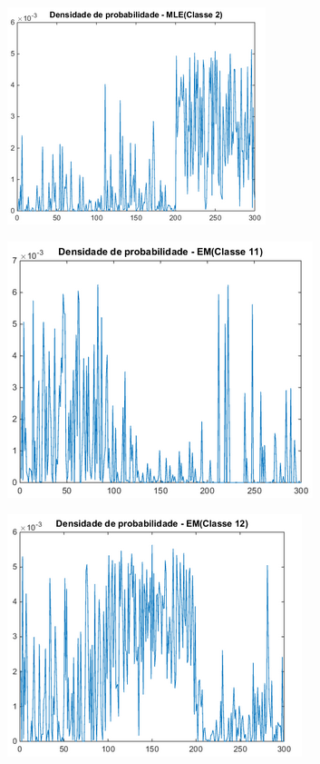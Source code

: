 \documentclass[12pt,twoside]{report}
\begin{document}
\begin{figure}[ht]
    \centering
    \includegraphics[scale=0.85]{pdf_mle_c2}
    \caption{}
    \label{fig:pdf_mle_c2}
\end{figure}

\begin{figure}[ht]
    \centering
    \includegraphics[scale=0.75]{pdf_em_c11}
    \caption{}
    \label{fig:pdf_em_c11}
\end{figure}

\begin{figure}[ht]
    \centering
    \includegraphics[scale=0.75]{pdf_em_c12}
    \caption{}
    \label{fig:pdf_em_c12}
\end{figure}
\end{document}
